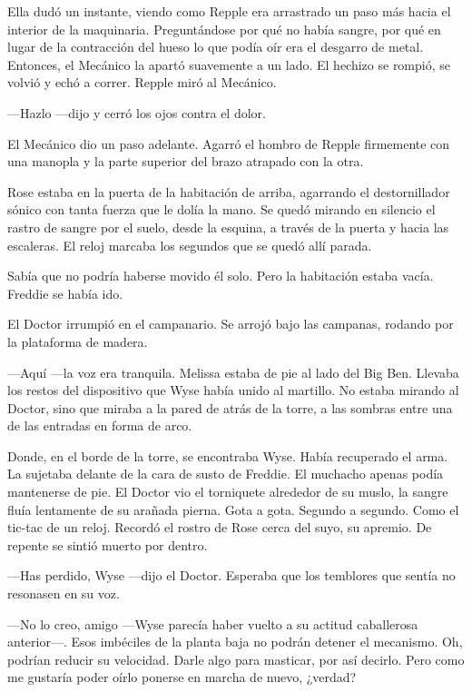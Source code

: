 {Ella dudó un instante, viendo como Repple era arrastrado un paso más
	hacia el interior de la maquinaria. Preguntándose por qué no había
	sangre, por qué en lugar de la contracción del hueso lo que podía oír
	era el desgarro de metal. Entonces, el Mecánico la apartó suavemente a
	un lado. El hechizo se rompió, se volvió y echó a correr. Repple miró al
Mecánico.}

{---Hazlo ---dijo y cerró los ojos contra el dolor.}

{El Mecánico dio un paso adelante. Agarró el hombro de Repple firmemente
con una manopla y la parte superior del brazo atrapado con la otra.}

{Rose estaba en la puerta de la habitación de arriba, agarrando el
	destornillador sónico con tanta fuerza que le dolía la mano. Se quedó
	mirando en silencio el rastro de sangre por el suelo, desde la esquina,
	a través de la puerta y hacia las escaleras. El reloj marcaba los
segundos que se quedó allí parada.}

{Sabía que no podría haberse movido él solo. Pero la habitación estaba
vacía. Freddie se había ido.}

{El Doctor irrumpió en el campanario. Se arrojó bajo las campanas,
rodando por la plataforma de madera.}

{---Aquí ---la voz era tranquila. Melissa estaba de pie al lado del Big
	Ben. Llevaba los restos del dispositivo que Wyse había unido al
	martillo. No estaba mirando al Doctor, sino que miraba a la pared de
	atrás de la torre, a las sombras entre una de las entradas en forma de
arco.}

{Donde, en el borde de la torre, se encontraba Wyse. Había recuperado el
	arma. La sujetaba delante de la cara de susto de Freddie. El muchacho
	apenas podía mantenerse de pie. El Doctor vio el torniquete alrededor de
	su muslo, la sangre fluía lentamente de su arañada pierna. Gota a gota.
	Segundo a segundo. Como el tic-tac de un reloj. Recordó el rostro de
	Rose cerca del suyo, su apremio. De repente se sintió muerto por
dentro.}

{---Has perdido, Wyse ---dijo el Doctor. Esperaba que los temblores que
sentía no resonasen en su voz.}

{---No lo creo, amigo ---Wyse parecía haber vuelto a su actitud
	caballerosa anterior---. Esos imbéciles de la planta baja no podrán
	detener el mecanismo. Oh, podrían reducir su velocidad. Darle algo para
	masticar, por así decirlo. Pero como me gustaría poder oírlo ponerse en
marcha de nuevo, ¿verdad?}

